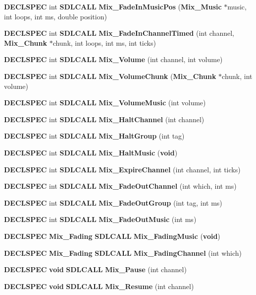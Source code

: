 \begin{DoxyCompactItemize}
\item 
{\bf D\+E\+C\+L\+S\+P\+E\+C} int {\bf S\+D\+L\+C\+A\+L\+L} {\bf Mix\+\_\+\+Fade\+In\+Music\+Pos} ({\bf Mix\+\_\+\+Music} $\ast$music, int loops, int ms, double position)
\item 
{\bf D\+E\+C\+L\+S\+P\+E\+C} int {\bf S\+D\+L\+C\+A\+L\+L} {\bf Mix\+\_\+\+Fade\+In\+Channel\+Timed} (int channel, {\bf Mix\+\_\+\+Chunk} $\ast$chunk, int loops, int ms, int ticks)
\item 
{\bf D\+E\+C\+L\+S\+P\+E\+C} int {\bf S\+D\+L\+C\+A\+L\+L} {\bf Mix\+\_\+\+Volume} (int channel, int volume)
\item 
{\bf D\+E\+C\+L\+S\+P\+E\+C} int {\bf S\+D\+L\+C\+A\+L\+L} {\bf Mix\+\_\+\+Volume\+Chunk} ({\bf Mix\+\_\+\+Chunk} $\ast$chunk, int volume)
\item 
{\bf D\+E\+C\+L\+S\+P\+E\+C} int {\bf S\+D\+L\+C\+A\+L\+L} {\bf Mix\+\_\+\+Volume\+Music} (int volume)
\item 
{\bf D\+E\+C\+L\+S\+P\+E\+C} int {\bf S\+D\+L\+C\+A\+L\+L} {\bf Mix\+\_\+\+Halt\+Channel} (int channel)
\item 
{\bf D\+E\+C\+L\+S\+P\+E\+C} int {\bf S\+D\+L\+C\+A\+L\+L} {\bf Mix\+\_\+\+Halt\+Group} (int tag)
\item 
{\bf D\+E\+C\+L\+S\+P\+E\+C} int {\bf S\+D\+L\+C\+A\+L\+L} {\bf Mix\+\_\+\+Halt\+Music} ({\bf void})
\item 
{\bf D\+E\+C\+L\+S\+P\+E\+C} int {\bf S\+D\+L\+C\+A\+L\+L} {\bf Mix\+\_\+\+Expire\+Channel} (int channel, int ticks)
\item 
{\bf D\+E\+C\+L\+S\+P\+E\+C} int {\bf S\+D\+L\+C\+A\+L\+L} {\bf Mix\+\_\+\+Fade\+Out\+Channel} (int which, int ms)
\item 
{\bf D\+E\+C\+L\+S\+P\+E\+C} int {\bf S\+D\+L\+C\+A\+L\+L} {\bf Mix\+\_\+\+Fade\+Out\+Group} (int tag, int ms)
\item 
{\bf D\+E\+C\+L\+S\+P\+E\+C} int {\bf S\+D\+L\+C\+A\+L\+L} {\bf Mix\+\_\+\+Fade\+Out\+Music} (int ms)
\item 
{\bf D\+E\+C\+L\+S\+P\+E\+C} {\bf Mix\+\_\+\+Fading} {\bf S\+D\+L\+C\+A\+L\+L} {\bf Mix\+\_\+\+Fading\+Music} ({\bf void})
\item 
{\bf D\+E\+C\+L\+S\+P\+E\+C} {\bf Mix\+\_\+\+Fading} {\bf S\+D\+L\+C\+A\+L\+L} {\bf Mix\+\_\+\+Fading\+Channel} (int which)
\item 
{\bf D\+E\+C\+L\+S\+P\+E\+C} {\bf void} {\bf S\+D\+L\+C\+A\+L\+L} {\bf Mix\+\_\+\+Pause} (int channel)
\item 
{\bf D\+E\+C\+L\+S\+P\+E\+C} {\bf void} {\bf S\+D\+L\+C\+A\+L\+L} {\bf Mix\+\_\+\+Resume} (int channel)

\end{DoxyCompactItemize}
